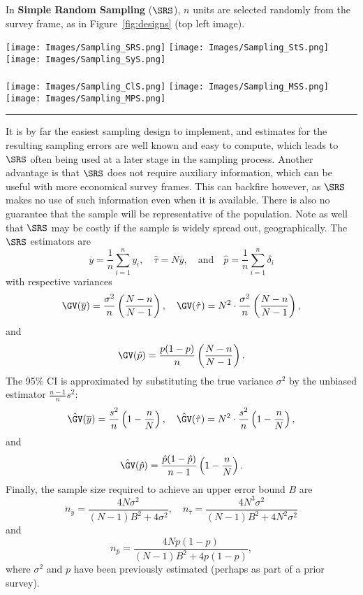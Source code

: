 In \textbf{Simple Random Sampling} ($\SRS$), $n$ units are selected randomly from the survey frame, as in Figure~\ref{fig:designs} (top left image). \begin{figure*}[t]
\centering
\texttt{[image: Images/Sampling\_SRS.png]}\qquad
\texttt{[image: Images/Sampling\_StS.png]}\qquad
\texttt{[image: Images/Sampling\_SyS.png]}
\\ \ \\
\texttt{[image: Images/Sampling\_ClS.png]}\qquad
\texttt{[image: Images/Sampling\_MSS.png]}\qquad
\texttt{[image: Images/Sampling\_MPS.png]}
\caption[\small Schematics of sampling designs]{\small Schematics of sampling designs. Top row, from left to right: simple random sampling, stratified random sampling, systematic random sampling; bottom row, from left to right: cluster sampling, multi-stage sampling, multi-phase sampling.}
\hrule\label{fig:designs}
\end{figure*}
\afterpage{\FloatBarrier}
It is by far the easiest sampling design to implement, and estimates for the resulting sampling errors are well known and easy to compute, which leads to $\SRS$ often being used at a later stage in the sampling process. 
Another advantage is that $\SRS$ does not require auxiliary information, which can be useful with more economical survey frames. \newl This can backfire however, as $\SRS$ makes no use of such information even when it is available. There is also no guarantee that the sample will be representative of the population. Note as well that $\SRS$ may be costly if the sample is widely spread out, geographically.\newl 
The $\SRS$ estimators are 
$$\overline{y}=\frac{1}{n}\sum_{i=1}^n y_i, \quad \hat{\tau}=N\overline{y}, \quad\mbox{and}\quad \hat{p}=\frac{1}{n}\sum_{i=1}^n \delta_i$$ with respective variances
$$\GV(\overline{y})=\frac{\sigma^2}{n}\left(\frac{N-n}{N-1}\right),\quad \GV(\hat{\tau})=N^2\cdot\frac{\sigma^2}{n}\left(\frac{N-n}{N-1}\right),$$ and $$\GV(\hat{p})=\frac{p(1-p)}{n}\left(\frac{N-n}{N-1}\right).$$
The 95\% CI is approximated by substituting the true variance $\sigma^2$ by the unbiased estimator $\frac{n-1}{n}s^2$: $$\hat{\GV}(\overline{y})=\frac{s^2}{n}\left(1-\frac{n}{N}\right), \quad
\hat{\GV}(\hat{\tau})=N^2\cdot\frac{s^2}{n}\left(1-\frac{n}{N}\right),$$ and $$\hat{\GV}(\hat{p})=\frac{\hat{p}(1-\hat{p})}{n-1}\left(1-\frac{n}{N}\right).$$
Finally, the sample size required to achieve an upper error bound $B$ are $$n_{\overline{y}}=\frac{4N\sigma^2}{(N-1)B^2+4\sigma^2},\quad n_{\hat{\tau}}=\frac{4N^3\sigma^2}{(N-1)B^2+4N^2\sigma^2}$$ and $$n_{\hat{p}}=\frac{4Np(1-p)}{(N-1)B^2+4p(1-p)},$$ where $\sigma^2$ and $p$ have been previously estimated (perhaps as part of a prior survey). \newl 
